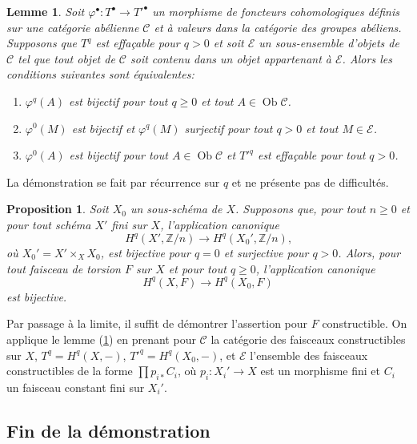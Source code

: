 \documentclass{article}
\DeclareMathOperator{\ob}{Ob}
\newcommand{\cC}{\mathcal{C}}
\newcommand{\cE}{\mathcal{E}}
\newcommand{\dZ}{\mathbb{Z}}
\newtheorem{proposition}[subsubsection]{Proposition}
\newtheorem{lemma}[subsubsection]{Lemme}
\begin{document}
\begin{lemma}\label{4-3-6}
Soit $\varphi^\bullet:T^\bullet\to {T'}^\bullet$ un morphisme de foncteurs 
cohomologiques définis sur une catégorie abélienne $\cC$ et à valeurs 
dans la catégorie des groupes abéliens. Supposons que $T^q$ est effaçable 
pour $q>0$ et soit $\cE$ un sous-ensemble d'objets de $\cC$ tel que tout objet 
de $\cC$ soit contenu dans un objet appartenant à $\cE$. Alors les 
conditions suivantes sont équivalentes:
\begin{enumerate}[\indent (i)]
  \item $\varphi^q(A)$ est bijectif pour tout $q\geqslant 0$ et tout 
    $A\in\ob \cC$.
  \item $\varphi^0(M)$ est bijectif et $\varphi^q(M)$ surjectif pour tout 
    $q>0$ et tout $M\in\cE$. 
  \item $\varphi^0(A)$ est bijectif pour tout $A\in\ob \cC$ et ${T'}^q$ est 
    effaçable pour tout $q>0$. 
\end{enumerate}
\end{lemma}

La démonstration se fait par récurrence sur $q$ et ne présente pas de 
difficultés. 





\begin{proposition}\label{4-3-7}
Soit $X_0$ un sous-schéma de $X$. Supposons que, pour tout $n\geqslant 0$ et 
pour tout schéma $X'$ fini sur $X$, l'application canonique 
\[
  H^q(X',\dZ/n) \to H^q(X_0',\dZ/n)\text{,}
\]
où $X_0' = X'\times_X X_0$, est bijective pour $q=0$ et surjective pour 
$q>0$. Alors, pour tout faisceau de torsion $F$ sur $X$ et pour tout 
$q\geqslant 0$, l'application canonique 
\[
  H^q(X,F) \to H^q(X_0,F)
\]
est bijective.
\end{proposition}

Par passage à la limite, il suffit de démontrer l'assertion pour $F$ 
constructible. On applique le lemme (\ref{4-3-6}) en prenant pour $\cC$ la 
catégorie des faisceaux constructibles sur $X$, $T^q=H^q(X,-)$, 
${T'}^q=H^q(X_0,-)$, et $\cE$ l'ensemble des faisceaux constructibles de la 
forme $\prod p_{i*} C_i$, où $p_i:X_i'\to X$ est un morphisme fini et $C_i$ 
un faisceau constant fini sur $X_i'$. 










\subsection{Fin de la démonstration}\label{4-4}
\end{document}
